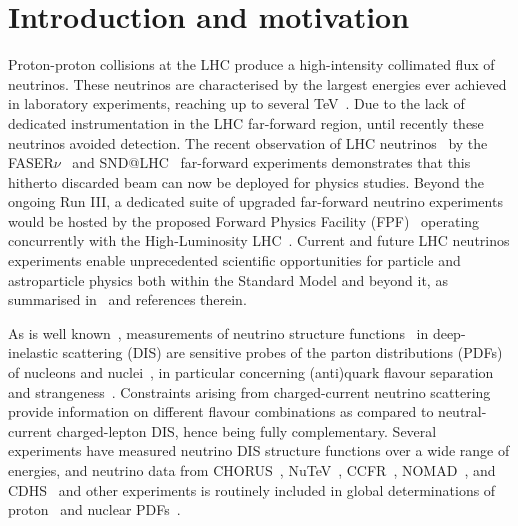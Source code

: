 \section{Introduction and motivation}
\label{sec:introduction}

Proton-proton collisions at the LHC produce a high-intensity collimated flux of neutrinos.
%
These neutrinos are characterised by the largest energies ever achieved in laboratory experiments,
reaching up to several TeV~\cite{Kling:2021gos}.
%
Due to the lack of dedicated instrumentation in the LHC far-forward region,
until recently these neutrinos avoided detection.
%
The recent observation of LHC neutrinos~\cite{FASER:2023zcr,SNDLHC:2023pun} by the
  FASER$\nu$~\cite{FASER:2019dxq} and SND@LHC~\cite{SHiP:2020sos,SNDLHC:2022ihg} far-forward experiments
demonstrates that this hitherto discarded beam can now be deployed for physics studies.
%
Beyond the ongoing Run III, a dedicated suite of upgraded far-forward
neutrino experiments would be hosted by the proposed
Forward Physics Facility (FPF)~\cite{Anchordoqui:2021ghd,Feng:2022inv} operating
concurrently with the High-Luminosity LHC~\cite{Azzi:2019yne,Cepeda:2019klc}.
%
Current and future LHC neutrinos experiments enable unprecedented scientific opportunities
for particle and astroparticle physics both within the Standard Model and beyond it,
as summarised in~\cite{Anchordoqui:2021ghd,Feng:2022inv}
and references therein.

As is well known~\cite{Conrad:1997ne,Mangano:2001mj},
measurements of neutrino structure functions~\cite{Candido:2023utz} in deep-inelastic scattering
(DIS) are sensitive probes of the parton distributions (PDFs)
of nucleons and nuclei~\cite{Ethier:2020way,Gao:2017yyd,Kovarik:2019xvh},  in particular
concerning (anti)quark  flavour separation and
strangeness~\cite{NuTeV:2007uwm,CCFR:1994ikl,Faura:2020oom,Alekhin:2014sya}.
%
Constraints arising from charged-current neutrino scattering provide information on
different flavour combinations as compared to neutral-current charged-lepton DIS,
hence being fully complementary.
%
Several  experiments have measured neutrino
DIS structure functions over a wide range of energies, and neutrino data
from CHORUS~\cite{CHORUS:2005cpn}, NuTeV~\cite{NuTeV:2001dfo},
CCFR~\cite{Yang:2000ju}, NOMAD~\cite{NOMAD:2013hbk}, and CDHS~\cite{Berge:1989hr}
and other experiments is routinely  included in global
determinations of proton~\cite{NNPDF:2021njg,Hou:2019efy,Bailey:2020ooq} and nuclear
PDFs~\cite{Eskola:2021nhw,AbdulKhalek:2022fyi,Muzakka:2022wey}.

